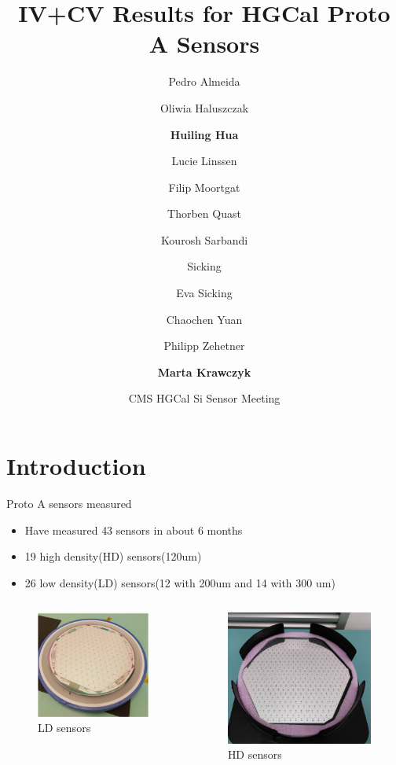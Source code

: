 \documentclass{beamer}
\title[Proto-A Sensors] %
{IV+CV Results for HGCal Proto A Sensors}
\author[Huiling Hua, Marta Krawczyk] %
{ Pedro Almeida\and Oliwia Haluszczak\and \textbf{Huiling Hua} \and Lucie Linssen\and Filip Moortgat\and Thorben Quast\and Kourosh Sarbandi\and Sicking\and Eva Sicking\and
Chaochen Yuan\and Philipp Zehetner\and \textbf{Marta Krawczyk} }
\date[29.03.2022] %
{CMS HGCal Si Sensor Meeting}
\begin{document}
\begin{frame}
  \titlepage
\end{frame}

\section{Introduction}

\begin{frame}{Proto A sensors measured}
    \begin{itemize}
        \item Have measured \alert{43 sensors} in about \alert{6 months} 
        \item 19 high density(HD) sensors(120um) 
        \item 26 low density(LD) sensors(12 with 200um and 14 with 300 um)
    \end{itemize}

    \begin{columns}
        \begin{figure}
            \includegraphics[width=.6\textwidth]{plots/LDsensors.png}
            \caption{LD sensors}
        \end{figure}
        \begin{figure}
            \includegraphics[width=.6\textwidth]{plots/HDsensors.png}
            \caption{HD sensors}
        \end{figure}
    \end{columns}

\end{frame}
\end{document}
